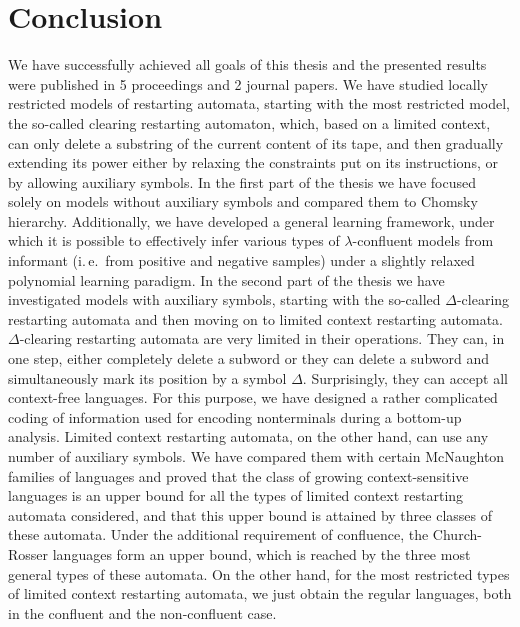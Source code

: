 \chapter*{Conclusion}\label{chapter:conclusion}

We have successfully achieved all goals of this thesis and the presented results were published in 5 proceedings and 2 journal papers. We have studied locally restricted models of restarting automata, starting with the most restricted model, the so-called clearing restarting automaton, which, based on a limited context, can only delete a substring of the current content of its tape, and then gradually extending its power either by relaxing the constraints put on its instructions, or by allowing auxiliary symbols. In the first part of the thesis we have focused solely on models without auxiliary symbols and compared them to Chomsky hierarchy. Additionally, we have developed a general learning framework, under which it is possible to effectively infer various types of $\lambda$-confluent models from informant (i.\,e.\ from positive and negative samples) under a slightly relaxed polynomial learning paradigm. In the second part of the thesis we have investigated models with auxiliary symbols, starting with the so-called $\Delta$-clearing restarting automata and then moving on to limited context restarting automata. $\Delta$-clearing restarting automata are very limited in their operations. They can, in one step, either completely delete a subword or they can delete a subword and simultaneously mark its position by a symbol $\Delta$. Surprisingly, they can accept all context-free languages. For this purpose, we have designed a rather complicated coding of information used for encoding nonterminals during a bottom-up analysis. Limited context restarting automata, on the other hand, can use any number of auxiliary symbols. We have compared them with certain McNaughton families of languages and proved that the class of growing context-sensitive languages is an upper bound for all the types of limited context restarting automata considered, and that this upper bound is attained by three classes of these automata. Under the additional requirement of confluence, the Church-Rosser languages form an upper bound, which is reached by the three most general types of these automata. On the other hand, for the most restricted types of limited context restarting automata, we just obtain the regular languages, both in the confluent and the non-confluent case.

